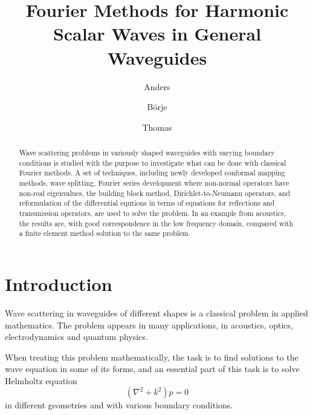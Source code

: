 \documentclass[numreferences]{kluwer}
\begin{document}
\begin{opening}
  \title{Fourier Methods for Harmonic Scalar Waves in General
    Waveguides}

  \author{Anders
    }
   \author{B\"orje
    }
   \author{Thomas
    } 
  \begin{abstract}
    Wave scattering problems in variously shaped waveguides with
    varying boundary conditions is studied with the purpose to
    investigate what can be done with classical Fourier methods. A set
    of techniques, including newly developed conformal mapping
    methods, wave splitting, Fourier series development where
    non-normal operators have non-real eigenvalues, the building block
    method, Dirichlet-to-Neumann operators, and reformulation of the
    differential equtions in terms of equations for reflections and
    transmission operators, are used to solve the problem. In an
    example from acoustics, the results are, with good correspondence
    in the low frequency domain, compared with a finite element method
    solution to the same problem.
  \end{abstract}
\end{opening}

\section{Introduction}
\label{sec:intro}

Wave scattering in waveguides of different shapes is a classical
problem in applied mathematics. The problem appears in many
applications, in acoustics, optics, electrodynamics and quantum
physics.

When treating this problem mathematically, the task is to find
solutions to the wave equation in some of its forms, and an essential
part of this task is to solve Helmholtz equation
\begin{equation}
  \label{eq:Helmholtz1}
  (\nabla^2+k^2)p=0
\end{equation}
in different geometries and with various boundary conditions.
\end{document}
